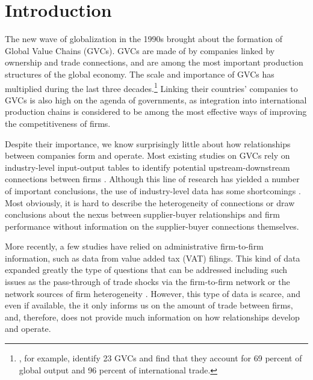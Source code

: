 \documentclass[final, dvipsnames, authoryear,12pt]{elsarticle}
\begin{document}

\section{Introduction}

The new wave of globalization in the 1990s brought about the formation of Global Value Chains (GVCs). GVCs are made of by companies linked by ownership and trade connections, and are among the most important production structures of the global economy. The scale and importance of GVCs has multiplied during the last three decades.\footnote{\cite{mckinsey2019gvc}, for example, identify 23 GVCs and find that they account for 69 percent of global output and 96 percent of international trade.} Linking their countries' companies to GVCs is also high on the agenda of governments, as integration into international production chains is considered to be among the most effective ways of improving the competitiveness of firms.

Despite their importance, we know surprisingly little about how relationships between companies form and operate. Most existing studies on GVCs rely on industry-level input-output tables to identify potential upstream-downstream connections between firms \citep{johnson2012accounting, hummels2001nature}. Although this line of research has yielded a number of important conclusions, the use of industry-level data has some shortcomings \citep{johnson2018measuring}. Most obviously, it is hard to describe the heterogeneity of connections or draw conclusions about the nexus between supplier-buyer relationships and firm performance without information on the supplier-buyer connections themselves.

More recently, a few studies have relied on administrative firm-to-firm information, such as data from value added tax (VAT) filings. This kind of data expanded greatly the type of questions that can be addressed including such issues as the pass-through of trade shocks via the firm-to-firm network \citep{tintelnot2018trade} or the network sources of firm heterogeneity \citep{bernard2019production}. However, this type of data is scarce, and even if available, the it only informs us on the amount of trade between firms, and, therefore, does not provide much information on how relationships develop and operate. 
\end{document}
